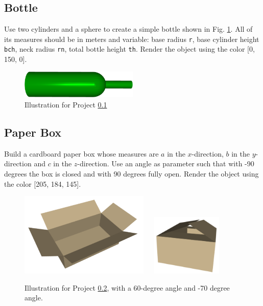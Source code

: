 \subsection{Bottle} \label{3.4}
Use two cylinders and a sphere to create a simple bottle shown in Fig. \ref{fig:b4}. 
All of its measures should be in meters and variable: base radius {\tt r}, base
cylinder height {\tt bch}, neck radius {\tt rn}, total bottle height {\tt th}.
Render the object using the color [0, 150, 0].

\begin{figure}[!ht]
\begin{center}
\includegraphics[width=0.5\textwidth]{img/bottle.png}
\end{center}
\vspace{-2mm}
\caption{Illustration for Project \ref{3.4}}
\label{fig:b4}
\end{figure}

\subsection{Paper Box} \label{3.5}

Build a cardboard paper box whose measures are $a$ in the $x$-direction, $b$ in the $y$-direction and $c$ in the 
$z$-direction. Use an angle as parameter such that with -90 degrees the box is closed and with 90 degrees fully 
open. Render the object using the color [205, 184, 145].

\begin{figure}[!ht]
\begin{center}
\includegraphics[width=0.55\textwidth]{img/paperbox.png}\ \ \ 
\includegraphics[width=0.3\textwidth]{img/paperbox1.png}
\end{center}
\vspace{-2mm}
\caption{Illustration for Project \ref{3.5}, with a 60-degree angle and -70 degree angle.}
\label{fig:pap1}
\end{figure}



